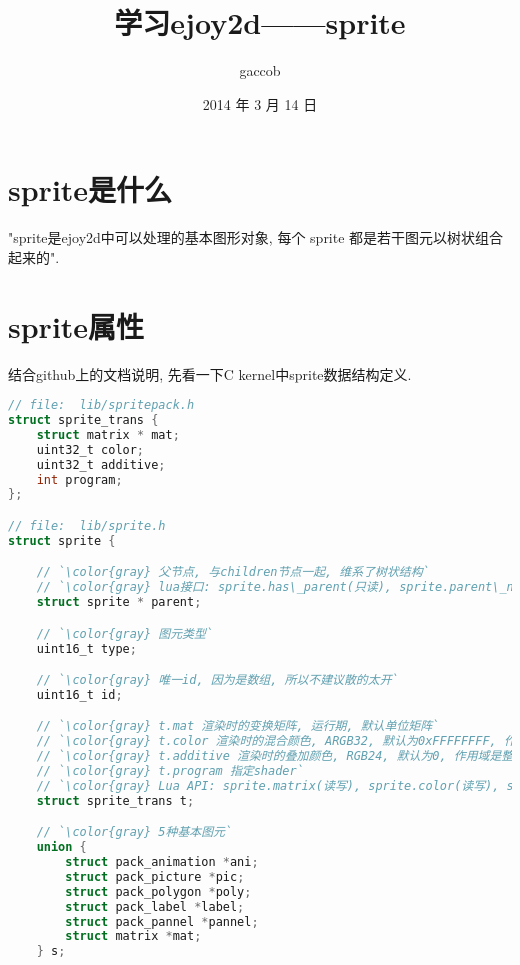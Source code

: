 

\title {\ZHH \huge 学习ejoy2d——sprite}
\author {\small gaccob}
\date {\small 2014 年 3 月 14 日}
\maketitle

\section {\ZHH sprite是什么} {
    { "sprite是ejoy2d中可以处理的基本图形对象, 每个 sprite 都是若干图元以树状组合起来的".}\par
}

\section {\ZHH sprite属性} {

    { 结合github上的文档说明, 先看一下C kernel中sprite数据结构定义.}\par

\begin{lstlisting}[language=C]
// file:  lib/spritepack.h
struct sprite_trans {
    struct matrix * mat;
    uint32_t color;
    uint32_t additive;
    int program;
};

// file:  lib/sprite.h
struct sprite {

    // `\color{gray} 父节点, 与children节点一起, 维系了树状结构`
    // `\color{gray} lua接口: sprite.has\_parent(只读), sprite.parent\_name(只读)`
    struct sprite * parent;

    // `\color{gray} 图元类型`
    uint16_t type;

    // `\color{gray} 唯一id, 因为是数组, 所以不建议散的太开`
    uint16_t id;

    // `\color{gray} t.mat 渲染时的变换矩阵, 运行期, 默认单位矩阵`
    // `\color{gray} t.color 渲染时的混合颜色, ARGB32, 默认为0xFFFFFFFF, 作用域是整个子树, 最常见的是做alpha半透明效果, 例如0x80FFFFFF就是50\%的半透明`
    // `\color{gray} t.additive 渲染时的叠加颜色, RGB24, 默认为0, 作用域是整个子树`
    // `\color{gray} t.program 指定shader`
    // `\color{gray} Lua API: sprite.matrix(读写), sprite.color(读写), sprite.additive(读写), sprite.program(只读)`
    struct sprite_trans t;

    // `\color{gray} 5种基本图元`
    union {
        struct pack_animation *ani;
        struct pack_picture *pic;
        struct pack_polygon *poly;
        struct pack_label *label;
        struct pack_pannel *pannel;
        struct matrix *mat;
    } s;


\end{lstlisting}}
